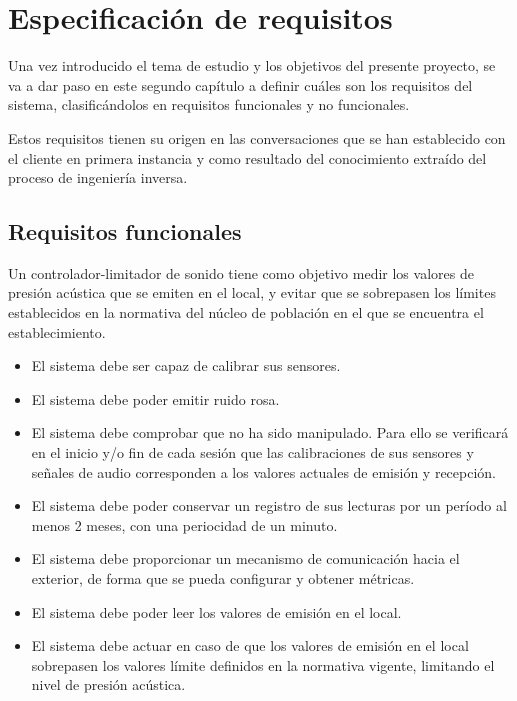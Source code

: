 \chapter{Especificación de requisitos} \label{cap:capitulo2}

Una vez introducido el tema de estudio y los objetivos del presente proyecto, se va a dar paso en este segundo capítulo a definir cuáles son los requisitos del sistema, clasificándolos en requisitos funcionales y no funcionales.

Estos requisitos tienen su origen en las conversaciones que se han establecido con el cliente en primera instancia y como resultado del conocimiento extraído del proceso de ingeniería inversa.

\section{Requisitos funcionales} \label{sec:rf}

Un controlador-limitador de sonido tiene como objetivo medir los valores de presión acústica que se emiten en el local, y evitar que se sobrepasen los límites establecidos en la normativa del núcleo de población en el que se encuentra el establecimiento.

\begin{itemize}
    \item El sistema debe ser capaz de calibrar sus sensores.

    \item El sistema debe poder emitir ruido rosa.

    \item El sistema debe comprobar que no ha sido manipulado. Para ello se verificará en el inicio y/o fin de cada sesión que las calibraciones de sus sensores y señales de audio corresponden a los valores actuales de emisión y recepción.

    \item El sistema debe poder conservar un registro de sus lecturas por un período al menos 2 meses, con una periocidad de un minuto.

    \item El sistema debe proporcionar un mecanismo de comunicación hacia el exterior, de forma que se pueda configurar y obtener métricas.

    \item El sistema debe poder leer los valores de emisión en el local.

    \item El sistema debe actuar en caso de que los valores de emisión en el local sobrepasen los valores límite definidos en la normativa vigente, limitando el nivel de presión acústica.
\end{itemize}

